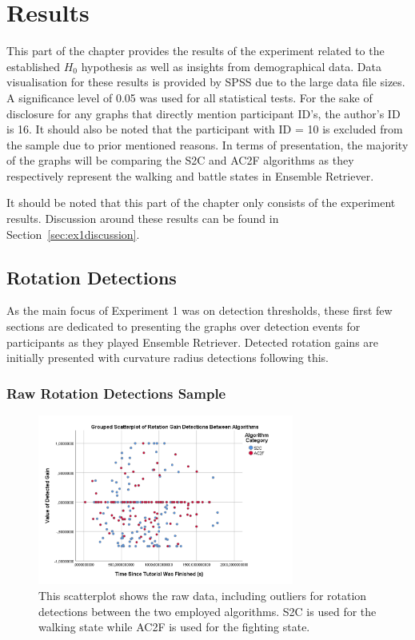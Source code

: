 \section{Results}\label{sec:ex1results}
This part of the chapter provides the results of the experiment related to the established $H_0$ hypothesis as well as insights from demographical data. Data visualisation for these results is provided by SPSS due to the large data file sizes. A significance level of 0.05 was used for all statistical tests. For the sake of disclosure for any graphs that directly mention participant ID's, the author's ID is 16. It should also be noted that the participant with ID = 10 is excluded from the sample due to prior mentioned reasons. In terms of presentation, the majority of the graphs will be comparing the S2C and AC2F algorithms as they respectively represent the walking and battle states in Ensemble Retriever.

It should be noted that this part of the chapter only consists of the experiment results. Discussion around these results can be found in Section~\ref{sec:ex1discussion}.

\subsection{Rotation Detections}
As the main focus of Experiment 1 was on detection thresholds, these first few sections are dedicated to presenting the graphs over detection events for participants as they played Ensemble Retriever. Detected rotation gains are initially presented with curvature radius detections following this.

\subsubsection{Raw Rotation Detections Sample}
\begin{figure}[tbph]
    \centering
    \includegraphics[width=0.75\textwidth]{figures/graphs/RawRotationDetections.png}
    \caption[Raw Detection Scatterplot For Rotation Gains]{This scatterplot shows the raw data, including outliers for rotation detections between the two employed algorithms. S2C is used for the walking state while AC2F is used for the fighting state.}
    \label{fig:rawRotationDetectionData}
\end{figure}

